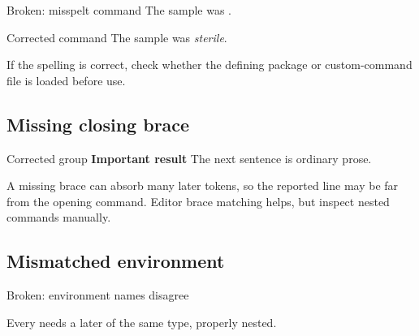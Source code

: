 \begin{latexcode}{Broken: misspelt command}
The sample was .
\end{latexcode}

\begin{latexcode}{Corrected command}
The sample was \emph{sterile}.
\end{latexcode}

If the spelling is correct, check whether the defining package or custom-command
file is loaded before use.

\subsection{Missing closing brace}

\begin{latexcode}{Broken: open argument}
\textbf{Important result
The next sentence is ordinary prose.
\end{latexcode}

\begin{latexcode}{Corrected group}
\textbf{Important result}
The next sentence is ordinary prose.
\end{latexcode}

A missing brace can absorb many later tokens, so the reported line may be far
from the opening command. Editor brace matching helps, but inspect nested
commands manually.

\subsection{Mismatched environment}

\begin{latexcode}{Broken: environment names disagree}
\end{latexcode}

Every  needs a later
 of the same type, properly nested.

